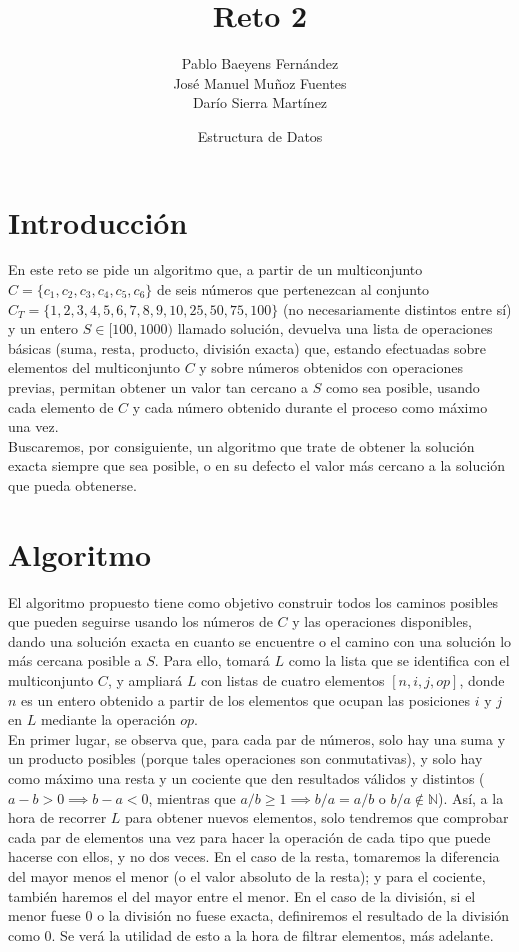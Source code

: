 \documentclass{article}
\title{Reto 2}
\date{Estructura de Datos}
\author{Pablo Baeyens Fernández\\José Manuel Muñoz Fuentes\\Darío Sierra Martínez}
\begin{document}
\maketitle

\section{Introducción}
En este reto se pide un algoritmo que, a partir de un multiconjunto $C = \{c_1,c_2,c_3,c_4,c_5,c_6\}$ de seis números
que pertenezcan al conjunto $C_T = \{1, 2, 3, 4, 5, 6, 7, 8, 9, 10, 25, 50, 75, 100\}$ (no necesariamente distintos entre sí)
y un entero $S \in [100, 1000)$ llamado solución, devuelva una lista de
operaciones básicas (suma, resta, producto, división exacta) que, estando
efectuadas sobre elementos del multiconjunto $C$ y sobre números obtenidos con
operaciones previas, permitan obtener un valor tan cercano a $S$ como sea
posible, usando cada elemento de $C$ y cada número obtenido durante el proceso como máximo una vez. \\

Buscaremos, por consiguiente, un algoritmo que trate de obtener la solución
exacta siempre que sea posible, o en su defecto el valor más cercano a la solución que
pueda obtenerse.

\section{Algoritmo}
El algoritmo propuesto tiene como objetivo construir todos los caminos posibles que pueden seguirse usando los números de $C$ y las operaciones disponibles, dando una solución exacta en cuanto se encuentre o el camino con una solución lo más cercana posible a $S$. Para ello, tomará $L$ como la lista que se
identifica con el multiconjunto $C$, y ampliará $L$ con listas de cuatro elementos
$[n, i, j, op]$, donde $n$ es un entero obtenido a partir de los elementos que ocupan
las posiciones $i$ y $j$ en $L$ mediante la operación $op$.\\

En primer lugar, se observa que, para cada par de números, solo hay una suma y un producto posibles (porque tales operaciones son conmutativas), y solo hay como máximo una resta y un cociente que den resultados válidos y distintos ($a-b > 0 \implies b - a < 0$, mientras que $a/b \ge 1 \implies b/a = a/b$ o $b/a \notin \mathds N$). Así, a la hora de recorrer $L$ para obtener nuevos elementos, solo tendremos que comprobar cada par de elementos una vez para hacer la operación de cada tipo que puede hacerse con ellos, y no dos veces. En el caso de la resta, tomaremos la diferencia del mayor menos el menor (o el valor absoluto de la resta); y para el cociente, también haremos el del mayor entre el menor. En el caso de la división, si el menor fuese $0$ o la división no fuese exacta, definiremos el resultado de la división como $0$. Se verá la utilidad de esto a la hora de filtrar elementos, más adelante. \\
\end{document}
